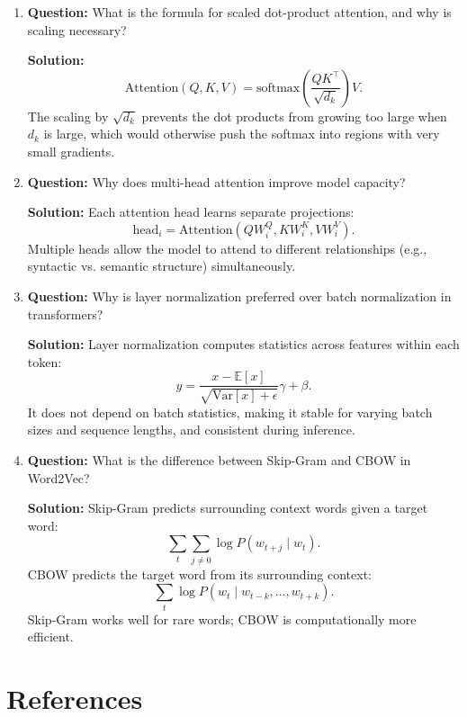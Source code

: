 \documentclass{article}
\begin{document}
\begin{enumerate}

\item \textbf{Question:}
What is the formula for scaled dot-product attention, and why is scaling necessary?

\textbf{Solution:}
\[
\text{Attention}(Q,K,V)
= \text{softmax}\!\left(\frac{QK^\top}{\sqrt{d_k}}\right)V.
\]
The scaling by $\sqrt{d_k}$ prevents the dot products from growing too large when $d_k$ is large, which would otherwise push the softmax into regions with very small gradients.

\item \textbf{Question:}
Why does multi-head attention improve model capacity?

\textbf{Solution:}
Each attention head learns separate projections:
\[
\text{head}_i = \text{Attention}(QW_i^Q, KW_i^K, VW_i^V).
\]
Multiple heads allow the model to attend to different relationships (e.g., syntactic vs. semantic structure) simultaneously.


\item \textbf{Question:}
Why is layer normalization preferred over batch normalization in transformers?

\textbf{Solution:}
Layer normalization computes statistics across features within each token:
\[
y = \frac{x - \mathbb{E}[x]}{\sqrt{\mathrm{Var}[x]+\epsilon}}\gamma + \beta.
\]
It does not depend on batch statistics, making it stable for varying batch sizes and sequence lengths, and consistent during inference.


\item \textbf{Question:}
What is the difference between Skip-Gram and CBOW in Word2Vec?

\textbf{Solution:}
Skip-Gram predicts surrounding context words given a target word:
\[
\sum_{t}\sum_{j\neq0} \log P(w_{t+j}\mid w_t).
\]
CBOW predicts the target word from its surrounding context:
\[
\sum_t \log P(w_t\mid w_{t-k},\dots,w_{t+k}).
\]
Skip-Gram works well for rare words; CBOW is computationally more efficient.

\end{enumerate}


\section{References}
\end{document}

